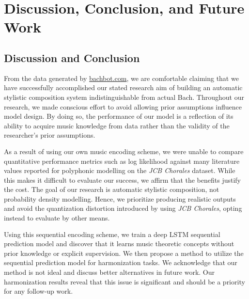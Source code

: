 \chapter{Discussion, Conclusion, and Future Work}\label{ch:conclusion}


\ifpdf
    \graphicspath{{Chapter8/Figs/Raster/}{Chapter8/Figs/PDF/}{Chapter8/Figs/}}
\else
    \graphicspath{{Chapter8/Figs/Vector/}{Chapter8/Figs/}}
\fi

\section{Discussion and Conclusion}

From the data generated by \url{bachbot.com}, we are comfortable claiming that
we have successfully accomplished our stated research aim of building an
automatic stylistic composition system indistinguishable from actual Bach.
Throughout our research, we made conscious effort to avoid allowing prior
assumptions influence model design. By doing so, the performance of our model
is a reflection of its ability to acquire music knowledge from data rather than
the validity of the researcher's prior assumptions.

As a result of using our own music encoding scheme, we were unable to compare
quantitative performance metrics such as log likelihood against many literature
values reported for polyphonic modelling on the \textit{JCB Chorales}
\citep{Allan2005}dataset. While this makes it difficult to evaluate our
success, we affirm that the benefits justify the cost. The goal of our research
is automatic stylistic composition, not probability density modelling. Hence,
we prioritize producing realistic outputs and avoid the quantization distortion
introduced by using \textit{JCB Chorales}, opting instead to evaluate by other
means.

Using this sequential encoding scheme, we train a deep LSTM sequential
prediction model and discover that it learns music theoretic concepts without
prior knowledge or explicit supervision. We then propose a method to utilize
the sequential prediction model for harmonization tasks. We acknowledge that
our method is not ideal and discuss better alternatives in future work. Our
harmonization results reveal that this issue is significant and should
be a priority for any follow-up work.

